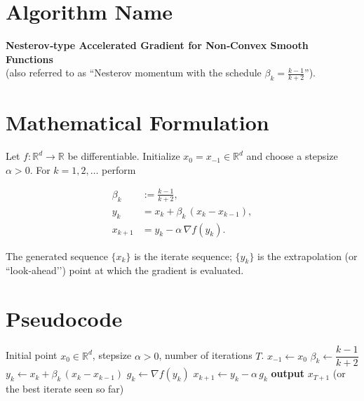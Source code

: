 \documentclass{article}
\newcommand{\grad}{\nabla}
\begin{document}
\section*{Algorithm Name}
\textbf{Nesterov‑type Accelerated Gradient for Non‑Convex Smooth Functions}\\
(also referred to as “Nesterov momentum with the schedule 
$\displaystyle\beta_k=\frac{k-1}{k+2}$”).

\section*{Mathematical Formulation}
Let $f:\mathbb{R}^d\rightarrow\mathbb{R}$ be differentiable.  
Initialize $x_{0}=x_{-1}\in\mathbb{R}^d$ and choose a stepsize $\alpha>0$.
For $k=1,2,\dots$ perform  

\[
\boxed{
\begin{aligned}
\beta_k &:= \frac{k-1}{k+2},\\[4pt]
y_k    &= x_k + \beta_k\,(x_k-x_{k-1}),\\[4pt]
x_{k+1}&= y_k - \alpha\,\grad f(y_k).
\end{aligned}}
\]

The generated sequence $\{x_k\}$ is the iterate sequence; $\{y_k\}$ is the
extrapolation (or ``look‑ahead’’) point at which the gradient is evaluated.

\section*{Pseudocode}
\begin{algorithm}[H]
\caption{Nesterov‑type Accelerated Gradient (non‑convex)}\label{alg:nag}
\begin{algorithmic}[1]
\Require Initial point $x_0\in\mathbb{R}^d$, stepsize $\alpha>0$,
        number of iterations $T$.
\State $x_{-1}\gets x_{0}$ 
    \State $\beta_k \gets \dfrac{k-1}{k+2}$                     
    \State $y_k \gets x_k + \beta_k\,(x_k-x_{k-1})$           
    \State $g_k \gets \grad f(y_k)$                           
    \State $x_{k+1} \gets y_k - \alpha\, g_k$                 
\EndFor
\State \textbf{output} $x_{T+1}$ (or the best iterate seen so far)
\end{algorithmic}
\end{algorithm}
\end{document}
